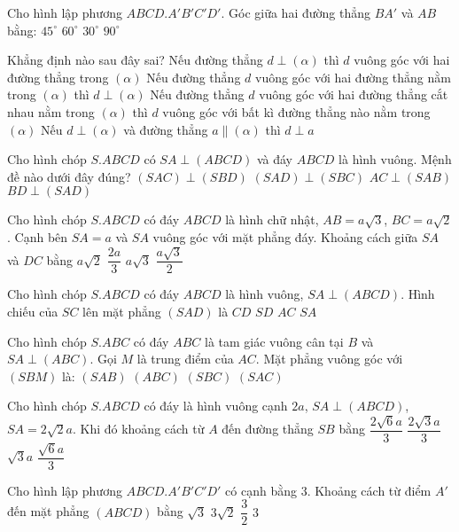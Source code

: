 \begin{ex}
Cho hình lập phương $ABCD.A'B'C'D'$. Góc giữa hai đường thẳng $BA'$ và $AB$ bằng:
\choice
{\True $45^\circ $}
{$60^\circ $}
{$30^\circ $}
{$90^\circ $}
\end{ex}
\begin{ex}
Khẳng định nào sau đây sai?
\choice
{Nếu đường thẳng $d\perp \left(\alpha\right)$ thì $d$ vuông góc với hai đường thẳng trong $\left(\alpha\right)$}
{\True Nếu đường thẳng $d$ vuông góc với hai đường thẳng nằm trong $\left(\alpha\right)$ thì $d\perp \left(\alpha\right)$}
{Nếu đường thẳng $d$ vuông góc với hai đường thẳng cắt nhau nằm trong $\left(\alpha\right)$ thì $d$ vuông góc với bất kì đường thẳng nào nằm trong $\left(\alpha\right)$}
{Nếu $d\perp \left(\alpha\right)$ và đường thẳng $a  \parallel \left(\alpha\right)$ thì $d\perp a$}
\end{ex}
\begin{ex}
Cho hình chóp $S.ABCD$ có $SA\perp (ABCD)$ và đáy $ABCD$ là hình vuông. Mệnh đề nào dưới đây đúng?
\choice
{\True $(SAC)\perp (SBD)$}
{$(SAD)\perp (SBC)$}
{$AC\perp (SAB)$}
{$BD\perp (SAD)$}
\end{ex}
\begin{ex}
Cho hình chóp $S.ABCD$ có đáy $ABCD$ là hình chữ nhật, $AB=a\sqrt{3}$, $BC=a\sqrt{2}$. Cạnh bên $SA=a$ và $SA$ vuông góc với mặt phẳng đáy. Khoảng cách giữa $SA$ và $DC$ bằng
\choice
{\True $a\sqrt{2}$}
{$\dfrac{2a}{3}$}
{$a\sqrt{3}$}
{$\dfrac{a\sqrt{3}}{2}$}
\end{ex}
\begin{ex}
Cho hình chóp $S.ABCD$ có đáy $ABCD$ là hình vuông, $SA\perp (ABCD)$. Hình chiếu của $SC$ lên mặt phẳng $(SAD)$ là
\choice
{$CD$}
{\True $SD$}
{$AC$}
{$SA$}
\end{ex}
\begin{ex}
Cho hình chóp $S.ABC$ có đáy $ABC$ là tam giác vuông cân tại $B$ và $SA\perp (ABC)$. Gọi $M$ là trung điểm của $AC$. Mặt phẳng vuông góc với $(SBM)$ là:
\choice
{$(SAB)$}
{$(ABC)$}
{$(SBC)$}
{\True $(SAC)$}
\end{ex}
\begin{ex}
Cho hình chóp $S.ABCD$ có đáy là hình vuông cạnh $2a$, $SA\perp (ABCD)$, $SA=2\sqrt{2}a$. Khi đó khoảng cách từ $A$ đến đường thẳng $SB$ bằng
\choice
{\True $\dfrac{2\sqrt{6}a}{3}$}
{$\dfrac{2\sqrt{3}a}{3}$}
{$\sqrt{3}a$}
{$\dfrac{\sqrt{6}a}{3}$}
\end{ex}
\begin{ex}
Cho hình lập phương $ABCD.A'B'C'D'$ có cạnh bằng $3$. Khoảng cách từ điểm $A'$ đến mặt phẳng $(ABCD)$ bằng
\choice
{$\sqrt{3}$}
{$3\sqrt{2}$}
{$\dfrac{3}{2}$}
{\True $3$}
\end{ex}
